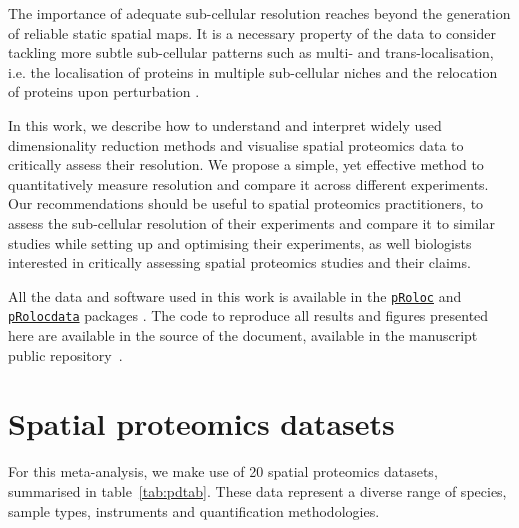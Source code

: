 \documentclass[12pt]{article}\usepackage[]{graphicx}\usepackage[]{color}
\newcommand{\Rpackage}[1]{\texttt{#1}}
\newcommand\Biocpkg[1]{%
  {\href{http://bioconductor.org/packages/#1}%
    {\Rpackage{#1}}}}
\newcommand\Biocexptpkg[1]{\Biocpkg{#1}}
\begin{document}
The importance of adequate sub-cellular resolution reaches beyond the
generation of reliable static spatial maps. It is a necessary property
of the data to consider tackling more subtle sub-cellular patterns
such as multi- and trans-localisation, i.e. the localisation of
proteins in multiple sub-cellular niches and the relocation of
proteins upon perturbation \citep{Gatto:2014}.

\bigskip

In this work, we describe how to understand and interpret widely used
dimensionality reduction methods and visualise spatial
proteomics data to critically assess their resolution. We propose a
simple, yet effective method to quantitatively measure resolution and
compare it across different experiments. Our recommendations should be
useful to spatial proteomics practitioners, to assess the sub-cellular
resolution of their experiments and compare it to similar studies
while setting up and optimising their experiments, as well biologists
interested in critically assessing spatial proteomics studies and
their claims.

All the data and software used in this work is available in the
\Biocpkg{pRoloc} and \Biocexptpkg{pRolocdata} packages
\citep{Gatto:2014a}. The code to reproduce all results and figures
presented here are available in the source of the document, available
in the manuscript public repository~\cite{qseprepo}.

\section{Spatial proteomics datasets}\label{sec:pdata}



For this meta-analysis, we make use of 20 spatial
proteomics datasets, summarised in table~\ref{tab:pdtab}. These data
represent a diverse range of species, sample types, instruments and
quantification methodologies.
\end{document}
